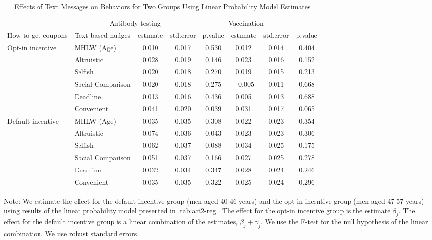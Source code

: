\begin{table}

\caption{Effects of Text Messages on Behaviors for Two Groups Using Linear Probability Model Estimates \label{tab:act2-reg-ftest}}
\centering
\fontsize{9}{11}\selectfont
\begin{threeparttable}
\begin{tabular}[t]{>{\raggedright\arraybackslash}p{5em}lcccccc}
\toprule
\multicolumn{2}{c}{ } & \multicolumn{3}{c}{Antibody testing} & \multicolumn{3}{c}{Vaccination} \\
\cmidrule(l{3pt}r{3pt}){3-5} \cmidrule(l{3pt}r{3pt}){6-8}
How to get coupons & Text-based nudges & estimate & std.error & p.value & estimate  & std.error  & p.value \\
\midrule
Opt-in incentive & MHLW (Age) & \num{0.010} & \num{0.017} & \num{0.530} & \num{0.012} & \num{0.014} & \num{0.404}\\
 & Altruistic & \num{0.028} & \num{0.019} & \num{0.146} & \num{0.023} & \num{0.016} & \num{0.152}\\
 & Selfish & \num{0.020} & \num{0.018} & \num{0.270} & \num{0.019} & \num{0.015} & \num{0.213}\\
 & Social Comparison & \num{0.020} & \num{0.018} & \num{0.275} & \num{-0.005} & \num{0.011} & \num{0.668}\\
 & Deadline & \num{0.013} & \num{0.016} & \num{0.436} & \num{0.005} & \num{0.013} & \num{0.688}\\
 & Convenient & \num{0.041} & \num{0.020} & \num{0.039} & \num{0.031} & \num{0.017} & \num{0.065}\\
Default incentive & MHLW (Age) & \num{0.035} & \num{0.035} & \num{0.308} & \num{0.022} & \num{0.023} & \num{0.354}\\
 & Altruistic & \num{0.074} & \num{0.036} & \num{0.043} & \num{0.023} & \num{0.023} & \num{0.306}\\
 & Selfish & \num{0.062} & \num{0.037} & \num{0.088} & \num{0.034} & \num{0.025} & \num{0.175}\\
 & Social Comparison & \num{0.051} & \num{0.037} & \num{0.166} & \num{0.027} & \num{0.025} & \num{0.278}\\
 & Deadline & \num{0.032} & \num{0.034} & \num{0.347} & \num{0.028} & \num{0.024} & \num{0.246}\\
 & Convenient & \num{0.035} & \num{0.035} & \num{0.322} & \num{0.025} & \num{0.024} & \num{0.296}\\
\bottomrule
\end{tabular}
\begin{tablenotes}
\item Note: We estimate the effect for the default incentive group (men aged 40-46 years) and the opt-in incentive group (men aged 47-57 years) using results of the linear probability model presented in \ref{tab:act2-reg}. The effect for the opt-in incentive group is the estimate $\beta_j$. The effect for the default incentive group is a linear combination of the estimates, $\beta_j + \gamma_j$. We use the F-test for the null hypothesis of the linear combination. We use robust standard errors.
\end{tablenotes}
\end{threeparttable}
\end{table}
